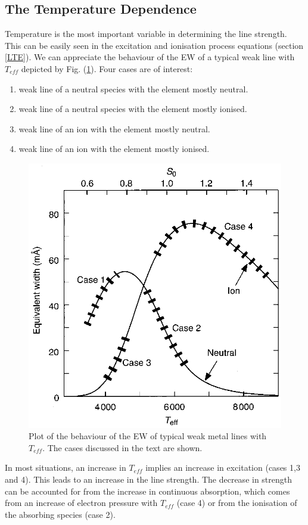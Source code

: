 \documentclass[dvips,12pt,a4paper]{report}
\begin{document}
{\subsection{The Temperature Dependence}

Temperature is the most important variable in determining the line strength. This can be easily seen in the excitation and ionisation process equations (section \ref{LTE}).
We can appreciate the behaviour of the EW of a typical weak line with $T_{eff}$ depicted by Fig. (\ref{ewdp}). Four cases are of interest:
\begin{enumerate}
 \item weak line of a neutral species with the element mostly neutral.
 \item weak line of a neutral species with the element mostly ionised.
 \item weak line of an ion with the element mostly neutral.
 \item weak line of an ion with the element mostly ionised.
\end{enumerate}
\begin{figure}[h]
\centering
\includegraphics[height=6 cm]{pics/parte2/temperature.eps}
\caption[EW dependence on Temperature and Pressure] {Plot of the behaviour of the EW of typical weak metal lines with $T_{eff}$. The cases discussed in the text are shown.}%
\label{ewdp}
\end{figure}

In most situations, an increase in $T_{eff}$ implies an increase in excitation (cases 1,3 and 4). This leads to an increase in the line strength. The decrease in strength can be accounted for from the increase in continuous absorption, which comes from an increase of electron pressure with $T_{eff}$ (case 4) or from the ionisation of the absorbing species (case 2). 

}
\end{document}
